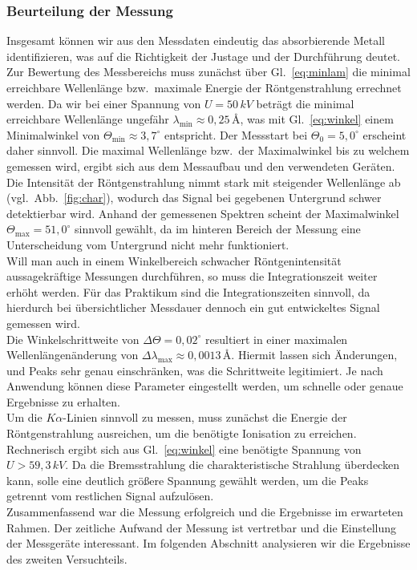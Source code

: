 \subsubsection{Beurteilung der Messung}
Insgesamt können wir aus den Messdaten eindeutig das absorbierende Metall identifizieren, was 
auf die Richtigkeit der Justage und der Durchführung deutet. 
Zur Bewertung des Messbereichs muss zunächst über Gl.~\eqref{eq:minlam} die minimal erreichbare 
Wellenlänge bzw.~maximale Energie der Röntgenstrahlung errechnet werden. Da wir bei einer Spannung 
von $U=50\,\si{kV}$ beträgt die minimal erreichbare Wellenlänge ungefähr 
$\lambda_{\text{min}}\approx0,25\,\si{\angstrom}$, was mit Gl.~\eqref{eq:winkel} einem Minimalwinkel 
von $\Theta_{\text{min}}\approx3,7^{\circ}$ entspricht. Der Messstart bei $\Theta_{0} = 5,0^{\circ}$ 
erscheint daher sinnvoll. Die maximal Wellenlänge bzw.~der Maximalwinkel bis zu welchem gemessen wird, 
ergibt sich aus dem Messaufbau und den verwendeten Geräten. Die Intensität der Röntgenstrahlung nimmt 
stark mit steigender Wellenlänge ab (vgl.~Abb.~\ref{fig:char}), wodurch das Signal 
bei gegebenen Untergrund schwer detektierbar wird. Anhand der gemessenen Spektren scheint der 
Maximalwinkel $\Theta_{\text{max}} = 51,0^{\circ}$ sinnvoll gewählt, da im hinteren Bereich der 
Messung eine Unterscheidung vom Untergrund nicht mehr funktioniert. \\
Will man auch in einem Winkelbereich schwacher Röntgenintensität aussagekräftige Messungen 
durchführen, so muss die Integrationszeit weiter erhöht werden. Für das Praktikum sind die 
Integrationszeiten sinnvoll, da hierdurch bei übersichtlicher Messdauer dennoch ein 
gut entwickeltes Signal gemessen wird. \\
Die Winkelschrittweite von $\Delta{\Theta} = 0,02^{\circ}$ resultiert in einer maximalen Wellenlängenänderung 
von $\Delta{\lambda}_{\text{max}}\approx 0,0013\,\si{\angstrom}$. Hiermit lassen sich Änderungen, und Peaks 
sehr genau einschränken, was die Schrittweite legitimiert. Je nach Anwendung können diese Parameter eingestellt
werden, um schnelle oder genaue Ergebnisse zu erhalten. \\
Um die $K\alpha$-Linien sinnvoll zu messen, muss zunächst die Energie der Röntgenstrahlung ausreichen, um 
die benötigte Ionisation zu erreichen. Rechnerisch ergibt sich aus Gl.~\eqref{eq:winkel} eine benötigte 
Spannung von $U>59,3\,\si{kV}$. Da die Bremsstrahlung die charakteristische Strahlung überdecken kann, 
solle eine deutlich größere Spannung gewählt werden, um die Peaks getrennt vom restlichen Signal aufzulösen. \\
Zusammenfassend war die Messung erfolgreich und die Ergebnisse im erwarteten Rahmen. Der zeitliche 
Aufwand der Messung ist vertretbar und die Einstellung der Messgeräte interessant. Im folgenden Abschnitt
analysieren wir die Ergebnisse des zweiten Versuchteils. \\








